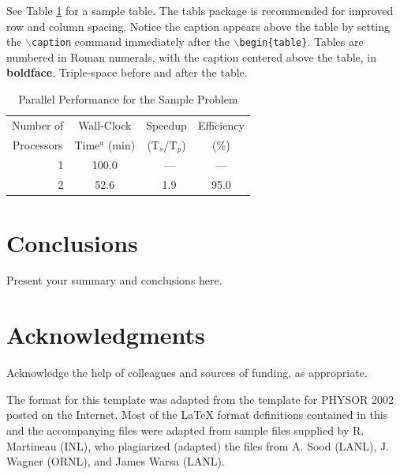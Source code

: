 \documentclass{ansconf}
\begin{document}
See Table \ref{table:example} for a sample table.  The tabls package is
recommended for improved row and column spacing.  Notice the caption appears
above the table by setting the \texttt{$\backslash$caption} command immediately
after the \texttt{$\backslash$begin\{table\}}. Tables are numbered in Roman
numerals, with the caption centered above the table, in {\bf boldface}.
Triple-space before and after the table.

\vspace{16pt}
\begin{table}[!htb]
\centering
\caption{Parallel Performance for the Sample Problem}
\label{table:example}
\vspace{14pt}
\begin{tabular}{||r||c|c|c||} \hline \hline
 \multicolumn{1}{||c||}{Number of} &
 \multicolumn{1}{c|}{Wall-Clock} &
 \multicolumn{1}{c|}{Speedup} &
 \multicolumn{1}{c||}{Efficiency} \\
 \multicolumn{1}{||c||}{Processors} &
 \multicolumn{1}{c|}{Time$^{a}$ (min)} &
 \multicolumn{1}{c|}{(T$_{s}$/T$_{p}$)} &
 \multicolumn{1}{c||}{(\%)} \\ \hline\hline
\ 1 &  100.0 & \ ---    & ---  \\ \hline
\ 2 &   52.6 & \ 1.9    & 95.0 \\ \hline \hline
\end{tabular}
\end{table}
\vspace{16pt}


\section{Conclusions}

Present your summary and conclusions here.


\section*{Acknowledgments}

Acknowledge the help of colleagues and sources of funding, as appropriate.

The format for this template was adapted from the template for PHYSOR 2002
posted on the Internet.  Most of the {\LaTeX} format definitions contained
in this and the accompanying files were adapted from sample files supplied
by R. Martineau (INL), who plagiarized (adapted) the files from A. Sood
(LANL), J. Wagner (ORNL), and James Warsa (LANL).


\setlength{\baselineskip}{12pt}



\end{document}
